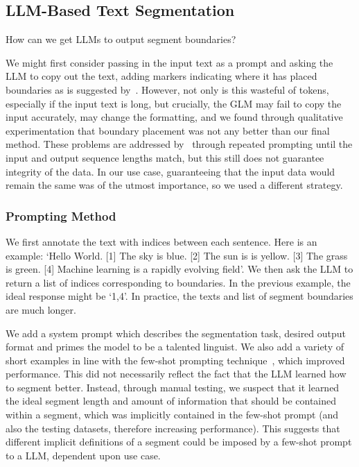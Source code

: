 
\subsection{LLM-Based Text Segmentation}\label{LLM-Based Text Segmentation}


How can we get LLMs to output segment boundaries?

We might first consider passing in the input text as a prompt and asking the LLM to copy out the text, adding markers indicating where it has placed boundaries as is suggested by~\citep{XingThesis}. However, not only is this wasteful of tokens, especially if the input text is long, but crucially, the GLM may fail to copy the input accurately, may change the formatting, and we found through qualitative experimentation that boundary placement was not any better than our final method. These problems are addressed by~\citep{XingThesis} through repeated prompting until the input and output sequence lengths match, but this still does not guarantee integrity of the data. In our use case, guaranteeing that the input data would remain the same was of the utmost importance, so we used a different strategy.

\subsubsection{Prompting Method}

We first annotate the text with indices between each sentence. Here is an example: `Hello World. [1] The sky is blue. [2] The sun is is yellow. [3] The grass is green. [4] Machine learning is a rapidly evolving field'. We then ask the LLM to return a list of indices corresponding to boundaries. In the previous example, the ideal response might be `1,4'. In practice, the texts and list of segment boundaries are much longer.

We add a system prompt which describes the segmentation task, desired output format and primes the model to be a talented linguist. We also add a variety of short examples in line with the few-shot prompting technique~\citep{FewShotLearners}, which improved performance. This did not necessarily reflect the fact that the LLM learned how to segment better. Instead, through manual testing, we suspect that it learned the ideal segment length and amount of information that should be contained within a segment, which was implicitly contained in the few-shot prompt (and also the testing datasets, therefore increasing performance). This suggests that different implicit definitions of a segment could be imposed by a few-shot prompt to a LLM, dependent upon use case.

